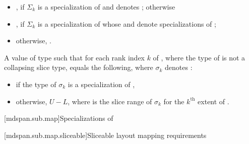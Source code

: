 \begin{itemdescr}
\begin{itemize}
\begin{itemize}
  \item
  ,
  if $\Sigma_k$ is a specialization of  and
   denotes ;
  otherwise

  \item
  ,
  if $\Sigma_k$ is a specialization of  whose
   and 
  denote specializations of ;

  \item
  otherwise,
  .
  \end{itemize}
\end{itemize}

\pnum
\returns
A value  of type  such that
for each rank index $k$ of ,
where the type of  is not a collapsing slice type,
equals the following,
where $\sigma_k$ denotes :
\begin{itemize}
\item
  if the type of $\sigma_k$ is a specialization of ,
\item
  otherwise,
  $U - L$, where  is the  slice range
  of $\sigma_k$ for the $k^\text{th}$ extent of .
\end{itemize}
\end{itemdescr}

[mdspan.sub.map]{Specializations of }

[mdspan.sub.map.sliceable]{Sliceable layout mapping requirements}

